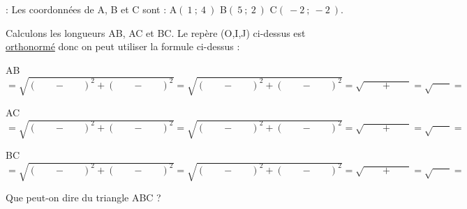 \documentclass[11pt,a4paper]{article}  %
\begin{document}
\begin{bexemple} : Les coordonnées de A, B et C sont :
	A$(\ 1 \ ; \ 4 \ )$ \quad B$(\ 5 \ ; \ 2 \ )$ \quad C$(\ -2 \ ; \ -2 \ )$.\\
	\begin{itemEx}
		\item Calculons les longueurs AB, AC et BC.
		\medskip
		Le repère (O,I,J) ci-dessus est \underline{orthonormé} donc on peut utiliser la formule ci-dessus :
		
		\medskip
		AB {
			{$= \sqrt{ \left(\phantom{xxx} - \phantom{xxx} \right)^2   +  \left(\phantom{xxx} -\phantom{xxx} \right)^2}= \sqrt{ \left(\phantom{xxx} - \phantom{xxx} \right)^2   +  \left(\phantom{xxx} -\phantom{xxx} \right)^2}= \sqrt{\phantom{xxx} +\phantom{xxx}}=\sqrt{\phantom{xxx} }=\phantom{xxx} $}} 
		
		
		
		
		
		\medskip
		AC {
			{$= \sqrt{ \left(\phantom{xxx} - \phantom{xxx} \right)^2   +  \left(\phantom{xxx} -\phantom{xxx} \right)^2}= \sqrt{ \left(\phantom{xxx} - \phantom{xxx} \right)^2   +  \left(\phantom{xxx} -\phantom{xxx} \right)^2}= \sqrt{\phantom{xxx} +\phantom{xxx}}=\sqrt{\phantom{xxx} }=\phantom{xxx} $}}
		
		\medskip
		BC {
			{$= \sqrt{ \left(\phantom{xxx} - \phantom{xxx} \right)^2   +  \left(\phantom{xxx} -\phantom{xxx} \right)^2}= \sqrt{ \left(\phantom{xxx} - \phantom{xxx} \right)^2   +  \left(\phantom{xxx} -\phantom{xxx} \right)^2}= \sqrt{\phantom{xxx} +\phantom{xxx}}=\sqrt{\phantom{xxx} }=\phantom{xxx} $}}
		
		\item Que peut-on dire du triangle ABC ?\\
		{}  
	\end{itemEx} 
\end{bexemple}
\end{document}
